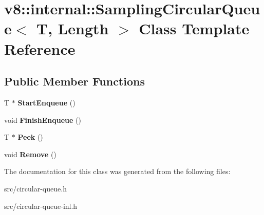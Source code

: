 \hypertarget{classv8_1_1internal_1_1_sampling_circular_queue}{}\section{v8\+:\+:internal\+:\+:Sampling\+Circular\+Queue$<$ T, Length $>$ Class Template Reference}
\label{classv8_1_1internal_1_1_sampling_circular_queue}
\subsection*{Public Member Functions}
\begin{DoxyCompactItemize}
\item 
\hypertarget{classv8_1_1internal_1_1_sampling_circular_queue_a464bbb1c0a62161897d417f2b6117dbf}{}T $\ast$ {\bfseries Start\+Enqueue} ()\label{classv8_1_1internal_1_1_sampling_circular_queue_a464bbb1c0a62161897d417f2b6117dbf}

\item 
\hypertarget{classv8_1_1internal_1_1_sampling_circular_queue_a80ba4d959f9f8d1fe8af4ce9c4dfa066}{}void {\bfseries Finish\+Enqueue} ()\label{classv8_1_1internal_1_1_sampling_circular_queue_a80ba4d959f9f8d1fe8af4ce9c4dfa066}

\item 
\hypertarget{classv8_1_1internal_1_1_sampling_circular_queue_a5259fbc4b5d578eecb0ef3a2566890f2}{}T $\ast$ {\bfseries Peek} ()\label{classv8_1_1internal_1_1_sampling_circular_queue_a5259fbc4b5d578eecb0ef3a2566890f2}

\item 
\hypertarget{classv8_1_1internal_1_1_sampling_circular_queue_ad12288f6816d0390fd9ec26bca49852a}{}void {\bfseries Remove} ()\label{classv8_1_1internal_1_1_sampling_circular_queue_ad12288f6816d0390fd9ec26bca49852a}

\end{DoxyCompactItemize}


The documentation for this class was generated from the following files\+:\begin{DoxyCompactItemize}
\item 
src/circular-\/queue.\+h\item 
src/circular-\/queue-\/inl.\+h\end{DoxyCompactItemize}
